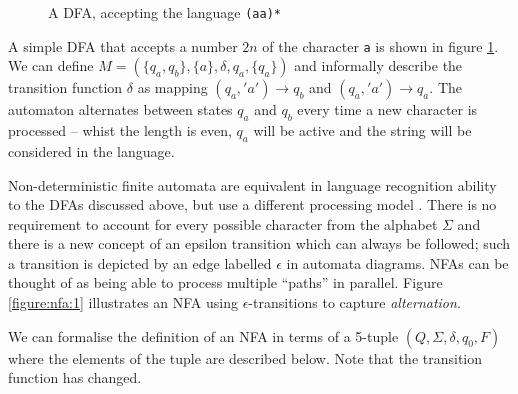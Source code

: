 \documentclass[a4paper,openany,12pt]{book}
\begin{document}
\begin{figure}[H]
\begin{MyMdframed}
\vspace{0.5em}


\caption{\label{figure:dfa:1} A DFA, accepting the language \texttt{(aa)*}}
\vspace{0.5em}
\captionsetup{style=default}


\vspace{0.5em}

\end{MyMdframed}

\end{figure}

A simple DFA that accepts a number $2n$ of the character \texttt{a} is shown in figure \ref{figure:dfa:1}. We can define $M = (\{q_a,q_b\}, \{a\}, \delta, q_a, \{q_a\})$ and informally describe the transition function $\delta$ as mapping $(q_a, 'a') \rightarrow q_b$ and $(q_a, 'a') \rightarrow q_a$. The automaton alternates between states $q_a$ and $q_b$ every time a new character is processed -- whist the length is even, $q_a$ will be active and the string will be considered in the language.

Non-deterministic finite automata are equivalent in language recognition ability to the DFAs discussed above, but use a different processing model \citep[p.~46]{sipser2012introduction}. There is no requirement to account for every possible character from the alphabet $\Sigma$ and there is a new concept of an epsilon transition which can always be followed; such a transition is depicted by an edge labelled $\epsilon$ in automata diagrams. NFAs can be thought of as being able to process multiple ``paths'' in parallel. Figure \ref{figure:nfa:1} illustrates an NFA using $\epsilon$-transitions to capture \emph{alternation}.

We can formalise the definition of an NFA in terms of a 5-tuple $(Q, \Sigma, \delta, q_0, F)$ where the elements of the tuple are described below. Note that the transition function has changed.
\end{document}
